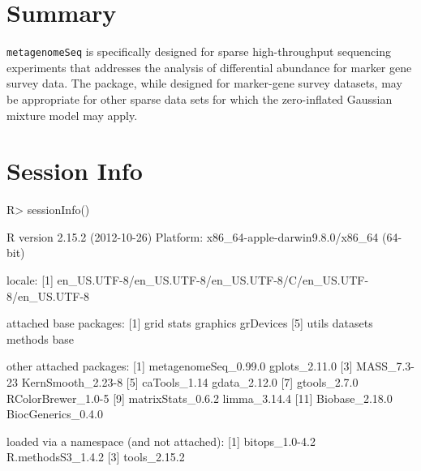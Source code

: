 \documentclass[a4paper,12pt]{article}
\begin{document}
\section{Summary}

\texttt{metagenomeSeq} is specifically designed for sparse high-throughput sequencing experiments that addresses the analysis of differential abundance for marker gene survey data. The package, while designed for marker-gene survey datasets, may be appropriate for other sparse data sets for which the zero-inflated Gaussian mixture model may apply.

\section{Session Info}
\begin{Schunk}
\begin{Sinput}
R> sessionInfo()
\end{Sinput}
\begin{Soutput}
R version 2.15.2 (2012-10-26)
Platform: x86_64-apple-darwin9.8.0/x86_64 (64-bit)

locale:
[1] en_US.UTF-8/en_US.UTF-8/en_US.UTF-8/C/en_US.UTF-8/en_US.UTF-8

attached base packages:
[1] grid      stats     graphics  grDevices
[5] utils     datasets  methods   base     

other attached packages:
 [1] metagenomeSeq_0.99.0 gplots_2.11.0       
 [3] MASS_7.3-23          KernSmooth_2.23-8   
 [5] caTools_1.14         gdata_2.12.0        
 [7] gtools_2.7.0         RColorBrewer_1.0-5  
 [9] matrixStats_0.6.2    limma_3.14.4        
[11] Biobase_2.18.0       BiocGenerics_0.4.0  

loaded via a namespace (and not attached):
[1] bitops_1.0-4.2    R.methodsS3_1.4.2
[3] tools_2.15.2     
\end{Soutput}
\end{Schunk}

\end{document}
